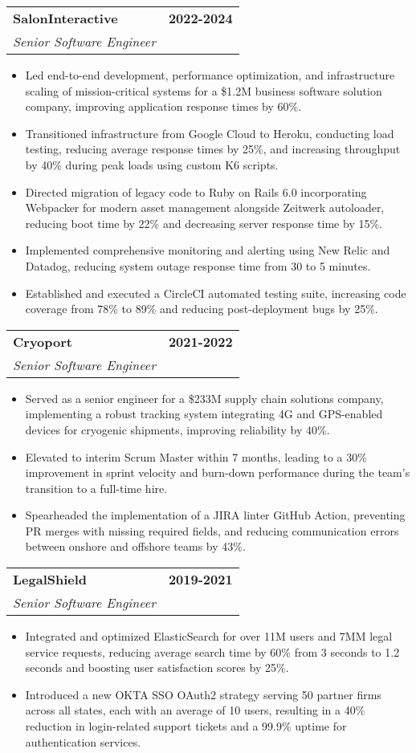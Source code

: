 \documentclass[letterpaper,12pt]{article}
\makeatletter
\newcommand{\resumeItem}[1]{
  \item\small{
    {#1 \vspace{1pt}}
  }
}
\newcommand{\resumeSubheading}[4]{
  \vspace{4pt}\item
    \begin{tabular*}{1.0\textwidth}[t]{l@{\extracolsep{\fill}}r}
      \textbf{#1} & \textbf{\small #2} \\
      \textit{\small#3} & \textit{\small #4} \\
    \end{tabular*}\vspace{-7pt}
}
\newcommand{\resumeItemListStart}{\begin{itemize}}
\newcommand{\resumeItemListEnd}{\end{itemize}\vspace{-5pt}}
\makeatother
\begin{document}
    \resumeSubheading
      {SalonInteractive}{2022-2024}
      {Senior Software Engineer}{}
      \resumeItemListStart
        \resumeItem{Led end-to-end development, performance optimization, and infrastructure scaling of mission-critical systems for a \$1.2M business software solution company, improving application response times by 60\%.}
        \resumeItem{Transitioned infrastructure from Google Cloud to Heroku, conducting load testing, reducing average response times by 25\%, and increasing throughput by 40\% during peak loads using custom K6 scripts.}
        \resumeItem{Directed migration of legacy code to Ruby on Rails 6.0 incorporating Webpacker for modern asset management alongside Zeitwerk autoloader, reducing boot time by 22\% and decreasing server response time by 15\%.}
        \resumeItem{Implemented comprehensive monitoring and alerting using New Relic and Datadog, reducing system outage response time from 30 to 5 minutes.}
        \resumeItem{Established and executed a CircleCI automated testing suite, increasing code coverage from 78\% to 89\% and reducing post-deployment bugs by 25\%.}
    \resumeItemListEnd

     \resumeSubheading
      {Cryoport}{2021-2022}
      {Senior Software Engineer}{}
      \resumeItemListStart
        \resumeItem{Served as a senior engineer for a \$233M supply chain solutions company, implementing a robust tracking system integrating 4G and GPS-enabled devices for cryogenic shipments, improving reliability by 40\%.}
        \resumeItem{Elevated to interim Scrum Master within 7 months, leading to a 30\% improvement in sprint velocity and burn-down performance during the team's transition to a full-time hire.}
        \resumeItem{Spearheaded the implementation of a JIRA linter GitHub Action, preventing PR merges with missing required fields, and reducing communication errors between onshore and offshore teams by 43\%.}
      \resumeItemListEnd

  \resumeSubheading
      {LegalShield}{2019-2021}
      {Senior Software Engineer}{}
      \resumeItemListStart
        \resumeItem{Integrated and optimized ElasticSearch for over 11M users and 7MM legal service requests, reducing average search time by 60\% from 3 seconds to 1.2 seconds and boosting user satisfaction scores by 25\%.}
        \resumeItem{Introduced a new OKTA SSO OAuth2 strategy serving 50 partner firms across all states, each with an average of 10 users, resulting in a 40\% reduction in login-related support tickets and a 99.9\% uptime for authentication services.}
      \resumeItemListEnd
\end{document}
